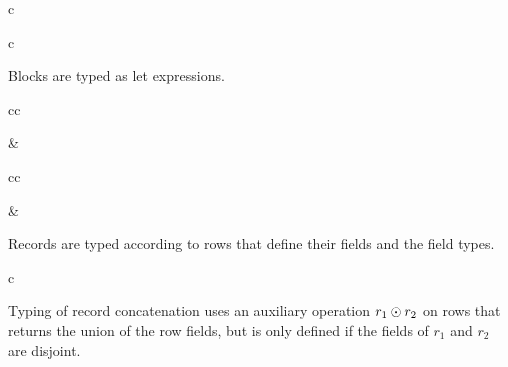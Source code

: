 \documentclass[11pt]{article}
\begin{document}
\begin{rules}{c}

\end{rules}

\begin{rules}{c}


\end{rules}

Blocks are typed as let expressions.

\begin{rules}{cc}


&


\end{rules}

\begin{rules}{cc}


&


\end{rules}

Records are typed according to rows that define their fields and the field types.

\begin{rules}{c}


\end{rules}

Typing of record concatenation uses an auxiliary operation $r_1 \odot r_2$ on rows that returns the union of the row fields, but is only defined if the fields of $r_1$ and $r_2$ are disjoint.
\end{document}
